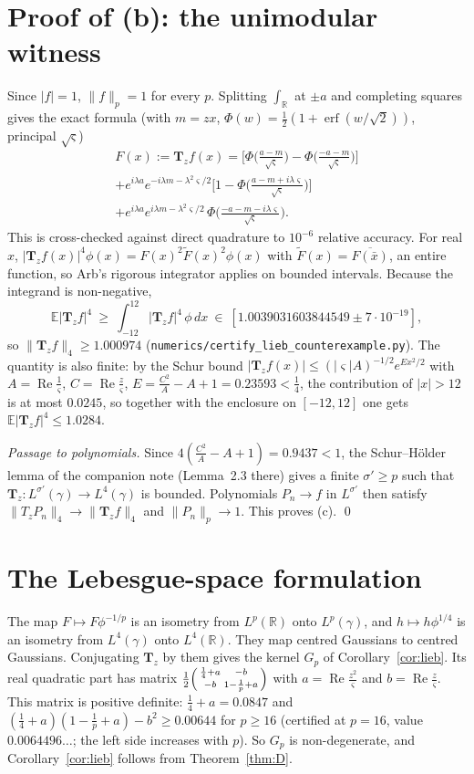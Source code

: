 \documentclass[11pt]{amsart}
\theoremstyle{definition}
\newcommand{\E}{\mathbb{E}}
\newcommand{\R}{\mathbb{R}}
\newcommand{\Rea}{\operatorname{Re}}
\newcommand{\bT}{\mathbf{T}}
\begin{document}
\section{Proof of (b): the unimodular witness}
Since $|f|=1$, $\|f\|_p=1$ for every $p$. Splitting $\int_\R$ at $\pm a$ and completing squares gives the exact
formula (with $m=zx$, $\Phi(w)=\frac12(1+\operatorname{erf}(w/\sqrt2))$, principal $\sqrt\varsigma$)
\begin{multline*}
F(x):=\bT_zf(x)=\Big[\Phi\big(\tfrac{a-m}{\sqrt\varsigma}\big)-\Phi\big(\tfrac{-a-m}{\sqrt\varsigma}\big)\Big]\\
+e^{i\lambda a}e^{-i\lambda m-\lambda^2\varsigma/2}\Big[1-\Phi\big(\tfrac{a-m+i\lambda\varsigma}{\sqrt\varsigma}\big)\Big]\\
+e^{i\lambda a}e^{i\lambda m-\lambda^2\varsigma/2}\,\Phi\big(\tfrac{-a-m-i\lambda\varsigma}{\sqrt\varsigma}\big).
\end{multline*}
This is cross-checked against direct quadrature to $10^{-6}$ relative accuracy. For real $x$,
$|\bT_zf(x)|^4\phi(x)=F(x)^2\widetilde F(x)^2\phi(x)$ with $\widetilde F(x)=\overline{F(\bar x)}$, an entire
function, so Arb's rigorous integrator applies on bounded intervals. Because the integrand is non-negative,
\[
\E|\bT_zf|^4\ \ge\ \int_{-12}^{12}|\bT_zf|^4\,\phi\,dx\ \in\ [1.0039031603844549\pm 7\cdot10^{-19}],
\]
so $\|\bT_zf\|_4\ge1.000974$ (\texttt{numerics/\allowbreak certify\_lieb\_counterexample.py}). The quantity is also finite: by
the Schur bound $|\bT_zf(x)|\le(|\varsigma|A)^{-1/2}e^{Ex^2/2}$ with $A=\Rea\frac1\varsigma$,
$C=\Rea\frac z\varsigma$, $E=\frac{C^2}{A}-A+1=0.23593<\frac14$, the contribution of $|x|>12$ is at most
$0.0245$, so together with the enclosure on $[-12,12]$ one gets $\E|\bT_zf|^4\le1.0284$.

\emph{Passage to polynomials.} Since $4(\frac{C^2}{A}-A+1)=0.9437<1$, the Schur--H\"older lemma of the companion
note (Lemma~2.3 there) gives a finite $\sigma'\ge p$ such that $\bT_z:L^{\sigma'}(\gamma)\to L^4(\gamma)$ is
bounded. Polynomials $P_n\to f$ in $L^{\sigma'}$ then satisfy $\|T_zP_n\|_4\to\|\bT_zf\|_4$ and
$\|P_n\|_p\to1$. This proves (c). \qed

\section{The Lebesgue-space formulation}
The map $F\mapsto F\phi^{-1/p}$ is an isometry from $L^p(\R)$ onto $L^p(\gamma)$, and $h\mapsto h\phi^{1/4}$ is an
isometry from $L^4(\gamma)$ onto $L^4(\R)$. They map centred Gaussians to centred Gaussians. Conjugating
$\bT_z$ by them gives the kernel $G_p$ of Corollary~\ref{cor:lieb}. Its real quadratic part has matrix
$\frac12\begin{psmallmatrix}\frac14+a&-b\\-b&1-\frac1p+a\end{psmallmatrix}$ with $a=\Rea\frac{z^2}{\varsigma}$ and
$b=\Rea\frac z\varsigma$. This matrix is positive definite: $\frac14+a=0.0847$ and
$(\frac14+a)(1-\frac1p+a)-b^2\ge0.00644$ for $p\ge16$ (certified at $p=16$, value $0.0064496\ldots$; the left side increases with $p$). So $G_p$ is non-degenerate, and
Corollary~\ref{cor:lieb} follows from Theorem~\ref{thm:D}.
\end{document}
